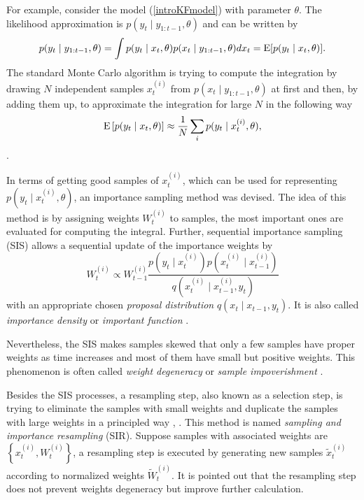 For example, consider the model (\ref{introKFmodel}) with parameter $\theta$. The likelihood approximation is $p(y_t\mid y_{1:t-1},\theta)$ and can be written by
\begin{equation*}
p(y_t\mid y_{1:t-1},\theta) = \int p(y_t\mid x_t,\theta)p(x_t\mid y_{1:t-1},\theta) dx_t = \mathrm{E} \lbrack p(y_t\mid x_t,\theta)\rbrack.
\end{equation*}
The standard Monte Carlo algorithm is trying to compute the integration by drawing $N$ independent samples $x_t^{(i)}$ from $p(x_t\mid y_{1:t-1},\theta)$ at first and then, by adding them up, to approximate the integration for large $N$ in the following way 
\begin{equation*}
\mathrm{E}\left[p(y_t\mid x_t,\theta)\right]\approx \frac{1}{N}\sum_i p(y_t\mid x_t^{(i)},\theta), 
\end{equation*}
\cite{kalos2008monte}.

In terms of getting good samples of $x_t^{(i)}$, which can be used for representing $p(y_t\mid x_t^{(i)},\theta)$, an importance sampling method was devised. The idea of this method is by assigning weights $W_t^{(i)}$ to samples, the most important ones are evaluated for computing the integral. Further, sequential importance sampling (SIS) allows a sequential update of the importance weights by 
\begin{equation*}
W_t^{(i)} \propto W_{t-1}^{(i)} \frac{ p\left(y_t \mid x_t^{(i)}\right) p\left(x_{t}^{(i)}\mid x_{t-1}^{(i)}\right) }{q\left(x_{t}^{(i)}\mid x_{t-1}^{(i)},y_{t}\right)}
\end{equation*}
with an appropriate chosen \textit{proposal distribution} $q(x_{t}\mid  x_{t-1},y_{t})$. It is also called \textit{importance density} or \textit{important function} \cite{chen2003bayesian}. 


Nevertheless, the SIS makes samples skewed that only a few samples have proper weights as time increases and most of them have small but positive weights. This phenomenon is often called \textit{weight degeneracy} or \textit{sample impoverishment} \cite{green1995reversible} \cite{berzuini1997dynamic}. 


Besides the SIS processes, a resampling step, also known as a selection step, is trying to eliminate the samples with small weights and duplicate the samples with large weights in a principled way \cite{rubin2004multiple}, \cite{tanner1987calculation}. This method is named \textit{sampling and importance resampling} (SIR). Suppose samples with associated weights are $\left\lbrace x_t^{(i)},W_t^{(i)}\right\rbrace$, a resampling step is executed by generating new samples $\tilde{x}_t^{(i)}$ according to normalized weights $\tilde{W}_t^{(i)}$. It is pointed out that the resampling step does not prevent weights degeneracy but improve further calculation. 

